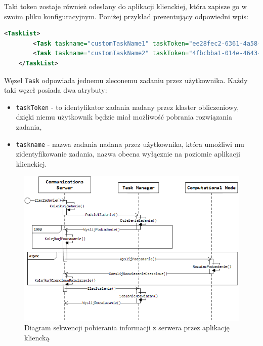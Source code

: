 \documentclass[12pt,a4paper,titlepage]{report}
\begin{document}
    Taki token zostaje również odesłany do aplikacji klienckiej, która zapisze go w swoim pliku konfiguracyjnym. Poniżej przykład prezentujący odpowiedni wpis:
    
    \begin{lstlisting}[language=XML,numbers=none]
    <TaskList>
    	<Task taskname="customTaskName1" taskToken="ee28fec2-6361-4a58-aaf1-b9ff0f509743"/>
    	<Task taskname="customTaskName2" taskToken="4fbcbba1-014e-4643-b60f-f7888a95bb54"/>
    </TaskList>
    \end{lstlisting}
    Węzeł \verb+Task+ odpowiada jednemu zleconemu zadaniu przez użytkownika. Każdy taki węzeł posiada dwa atrybuty:
	
	\begin{itemize}
		\item \verb+taskToken+ - to identyfikator zadania nadany przez klaster obliczeniowy, dzięki niemu użytkownik będzie miał możliwość pobrania rozwiązania zadania,
		\item \verb+taskname+ - nazwa zadania nadana przez użytkownika, która umożliwi mu zidentyfikowanie zadania, nazwa obecna wyłącznie na poziomie aplikacji klienckiej.
	\end{itemize}	    
      
	
	\begin{figure}[h]
		\centering
		\caption{Diagram sekwencji pobierania informacji z serwera przez aplikację kliencką}
		\includegraphics[width=\textwidth]{img/communication/computation.png}
	\end{figure}    
    
\end{document}
